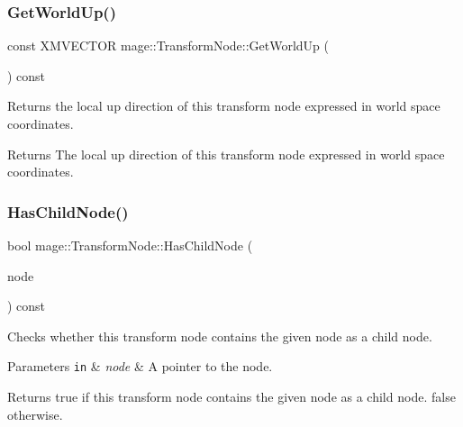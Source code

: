 \subsubsection{\texorpdfstring{Get\+World\+Up()}{GetWorldUp()}}
{\footnotesize\ttfamily const X\+M\+V\+E\+C\+T\+OR mage\+::\+Transform\+Node\+::\+Get\+World\+Up (\begin{DoxyParamCaption}{ }\end{DoxyParamCaption}) const\hspace{0.3cm}{\ttfamily [noexcept]}}

Returns the local up direction of this transform node expressed in world space coordinates.

\begin{DoxyReturn}{Returns}
The local up direction of this transform node expressed in world space coordinates. 
\end{DoxyReturn}
\hypertarget{structmage_1_1_transform_node_ac83d9d2013494588fb45a469057b18f6}{}\label{structmage_1_1_transform_node_ac83d9d2013494588fb45a469057b18f6} 
\subsubsection{\texorpdfstring{Has\+Child\+Node()}{HasChildNode()}}
{\footnotesize\ttfamily bool mage\+::\+Transform\+Node\+::\+Has\+Child\+Node (\begin{DoxyParamCaption}\item[{\hyperlink{namespacemage_a1e01ae66713838a7a67d30e44c67703e}{Shared\+Ptr}$<$ const \hyperlink{classmage_1_1_node}{Node} $>$}]{node }\end{DoxyParamCaption}) const\hspace{0.3cm}{\ttfamily [private]}}

Checks whether this transform node contains the given node as a child node.


\begin{DoxyParams}[1]{Parameters}
\mbox{\tt in}  & {\em node} & A pointer to the node. \\
\hline
\end{DoxyParams}
\begin{DoxyReturn}{Returns}
{\ttfamily true} if this transform node contains the given node as a child node. {\ttfamily false} otherwise. 
\end{DoxyReturn}
\hypertarget{structmage_1_1_transform_node_ad225b5c9f2236f8c6c91dd7a6a9c4ffd}{}\label{structmage_1_1_transform_node_ad225b5c9f2236f8c6c91dd7a6a9c4ffd} 
